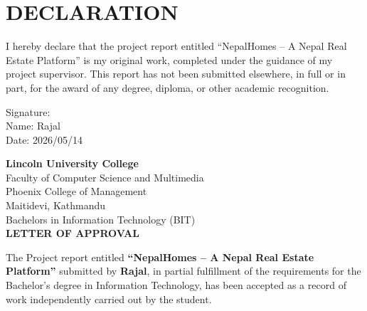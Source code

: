 \documentclass[12pt,a4paper]{report}
\begin{document}
\chapter*{DECLARATION}
\thispagestyle{plain}

I hereby declare that the project report entitled
``NepalHomes -- A Nepal Real Estate Platform''
is my original work, completed under the guidance of my project supervisor.
This report has not been submitted elsewhere, in full or in part,
for the award of any degree, diploma, or other academic recognition.

\vspace{2.5cm}
\noindent Signature:\\[10pt]
\noindent Name: Rajal\\
Date: 2026/05/14

\clearpage

\newpage
\begin{center}
    \vspace{0.5cm}
    {\LARGE \textbf{Lincoln University College}} \\
    {\Large Faculty of Computer Science and Multimedia} \\
    {\Large Phoenix College of Management} \\
    {\Large Maitidevi, Kathmandu} \\
    {\Large Bachelors in Information Technology (BIT)} \\

    \vspace{1cm}
    {\LARGE \textbf{LETTER OF APPROVAL}} \\
\end{center}

\vspace{1cm}

\noindent The Project report entitled \textbf{``NepalHomes -- A Nepal Real Estate Platform''} submitted by \textbf{Rajal}, in partial fulfillment of the requirements for the Bachelor's degree in Information Technology, has been accepted as a record of work independently carried out by the student.

\vspace{0.1cm}
\end{document}
